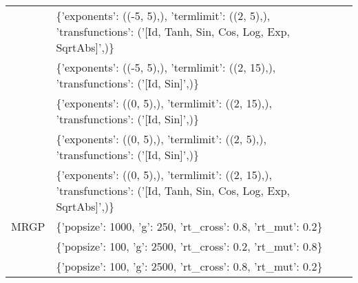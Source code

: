 \begin{tabular}{l p{37em}}
              &                                                                                                                                                                              \{'exponents': ((-5, 5),), 'termlimit': ((2, 5),), 'transfunctions': ('[Id, Tanh, Sin, Cos, Log, Exp, SqrtAbs]',)\} \\
              &                                                                                                                                                                                                           \{'exponents': ((-5, 5),), 'termlimit': ((2, 15),), 'transfunctions': ('[Id, Sin]',)\} \\
              &                                                                                                                                                                                                            \{'exponents': ((0, 5),), 'termlimit': ((2, 15),), 'transfunctions': ('[Id, Sin]',)\} \\
              &                                                                                                                                                                                                             \{'exponents': ((0, 5),), 'termlimit': ((2, 5),), 'transfunctions': ('[Id, Sin]',)\} \\
              &                                                                                                                                                                              \{'exponents': ((0, 5),), 'termlimit': ((2, 15),), 'transfunctions': ('[Id, Tanh, Sin, Cos, Log, Exp, SqrtAbs]',)\} \\
\midrule
         MRGP &                                                                                                                                                                                                                                    \{'popsize': 1000, 'g': 250, 'rt\_cross': 0.8, 'rt\_mut': 0.2\} \\
              &                                                                                                                                                                                                                                    \{'popsize': 100, 'g': 2500, 'rt\_cross': 0.2, 'rt\_mut': 0.8\} \\
              &                                                                                                                                                                                                                                    \{'popsize': 100, 'g': 2500, 'rt\_cross': 0.8, 'rt\_mut': 0.2\} \\

\end{tabular}
